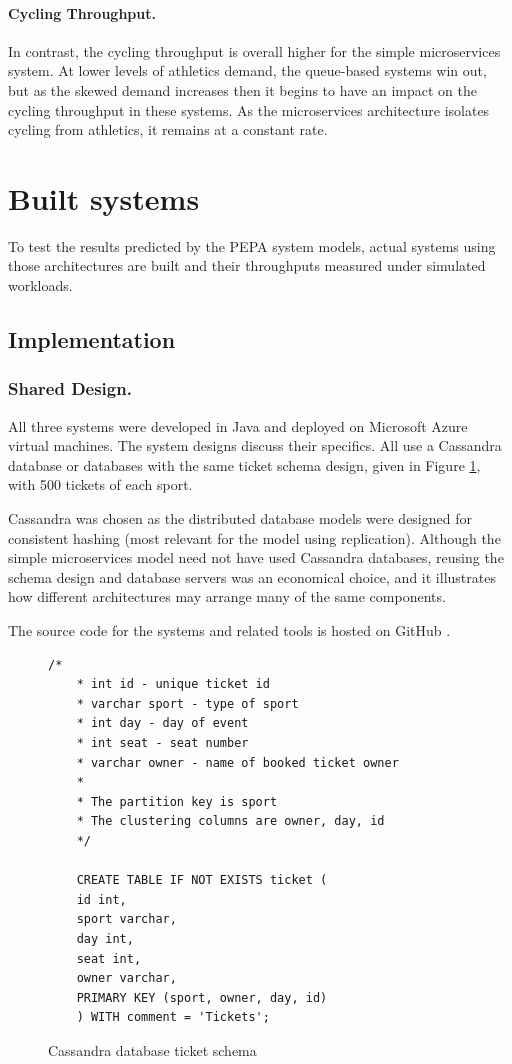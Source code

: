 \documentclass[runningheads]{llncs}
\begin{document}
\paragraph{Cycling Throughput.}  In contrast, the cycling throughput is overall higher for the simple microservices system.  At lower levels of athletics demand, the queue-based systems win out, but as the skewed demand increases then it begins to have an impact on the cycling throughput in these systems.  As the microservices architecture isolates cycling from athletics, it remains at a constant rate.

%
%
\FloatBarrier
\section{Built systems}\label{sec:built-systems}

To test the results predicted by the PEPA system models, actual systems using those architectures are built and their throughputs measured under simulated workloads.

\subsection{Implementation}

\subsubsection{Shared Design.}  All three systems were developed in Java and deployed on Microsoft Azure virtual machines.  The system designs discuss their specifics.  All use a Cassandra database or databases with the same ticket schema design, given in Figure \ref{figure:cassandra_ticket_schema}, with 500 tickets of each sport.

Cassandra was chosen as the distributed database models were designed for consistent hashing (most relevant for the model using replication).  Although the simple microservices model need not have used Cassandra databases, reusing the schema design and database servers was an economical choice, and it illustrates how different architectures may arrange many of the same components.

The source code for the systems and related tools is hosted on GitHub \cite{RN1073}.

\begin{figure}
	\centering
	\begin{lstlisting}[basicstyle=\ttfamily]
	/*
	* int id - unique ticket id
	* varchar sport - type of sport
	* int day - day of event
	* int seat - seat number
	* varchar owner - name of booked ticket owner
	* 
	* The partition key is sport
	* The clustering columns are owner, day, id
	*/
	
	CREATE TABLE IF NOT EXISTS ticket (
	id int,
	sport varchar,
	day int,
	seat int,
	owner varchar,
	PRIMARY KEY (sport, owner, day, id)
	) WITH comment = 'Tickets';
	\end{lstlisting}
	\caption{Cassandra database ticket schema}
	\label{figure:cassandra_ticket_schema}
\end{figure}
\end{document}
